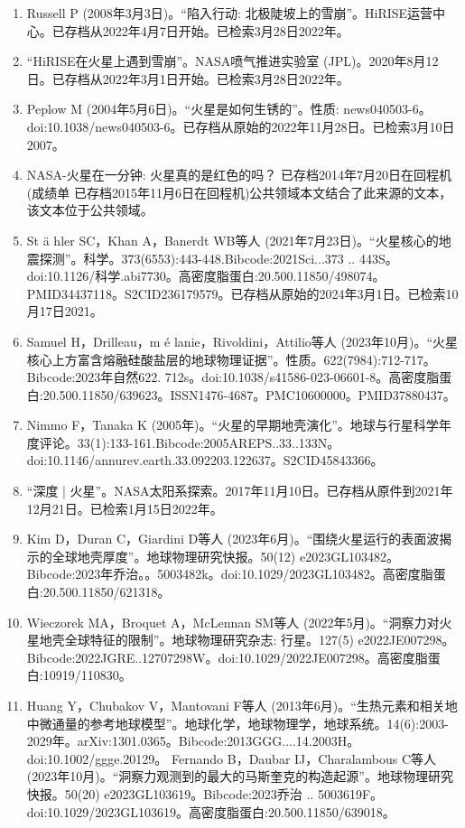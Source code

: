 \begin{enumerate}
\item Russell P (2008年3月3日)。“陷入行动: 北极陡坡上的雪崩”。HiRISE运营中心。已存档从2022年4月7日开始。已检索3月28日2022年。
\item “HiRISE在火星上遇到雪崩”。NASA喷气推进实验室 (JPL)。2020年8月12日。已存档从2022年3月1日开始。已检索3月28日2022年。
\item Peplow M (2004年5月6日)。“火星是如何生锈的”。性质: news040503-6。doi:10.1038/news040503-6。已存档从原始的2022年11月28日。已检索3月10日2007。
\item NASA-火星在一分钟: 火星真的是红色的吗？ 已存档2014年7月20日在回程机(成绩单 已存档2015年11月6日在回程机)公共领域本文结合了此来源的文本，该文本位于公共领域。
\item St ä hler SC，Khan A，Banerdt WB等人 (2021年7月23日)。“火星核心的地震探测”。科学。373(6553):443-448.Bibcode:2021Sci...373 .. 443S。doi:10.1126/科学.abi7730。高密度脂蛋白:20.500.11850/498074。PMID34437118。S2CID236179579。已存档从原始的2024年3月1日。已检索10月17日2021。   
\item Samuel H，Drilleau，m é lanie，Rivoldini，Attilio等人 (2023年10月)。“火星核心上方富含熔融硅酸盐层的地球物理证据”。性质。622(7984):712-717。Bibcode:2023年自然622. 712s。doi:10.1038/s41586-023-06601-8。高密度脂蛋白:20.500.11850/639623。ISSN1476-4687。PMC10600000。PMID37880437。    
\item Nimmo F，Tanaka K (2005年)。“火星的早期地壳演化”。地球与行星科学年度评论。33(1):133-161.Bibcode:2005AREPS..33..133N。doi:10.1146/annurev.earth.33.092203.122637。S2CID45843366。 
\item “深度 | 火星”。NASA太阳系探索。2017年11月10日。已存档从原件到2021年12月21日。已检索1月15日2022年。
\item Kim D，Duran C，Giardini D等人 (2023年6月)。“围绕火星运行的表面波揭示的全球地壳厚度”。地球物理研究快报。50(12) e2023GL103482。Bibcode:2023年乔治。。5003482k。doi:10.1029/2023GL103482。高密度脂蛋白:20.500.11850/621318。
\item Wieczorek MA，Broquet A，McLennan SM等人 (2022年5月)。“洞察力对火星地壳全球特征的限制”。地球物理研究杂志: 行星。127(5) e2022JE007298。Bibcode:2022JGRE..12707298W。doi:10.1029/2022JE007298。高密度脂蛋白:10919/110830。
\item Huang Y，Chubakov V，Mantovani F等人 (2013年6月)。“生热元素和相关地中微通量的参考地球模型”。地球化学，地球物理学，地球系统。14(6):2003-2029年。arXiv:1301.0365。Bibcode:2013GGG....14.2003H。doi:10.1002/ggge.20129。
 Fernando B，Daubar IJ，Charalambous C等人 (2023年10月)。“洞察力观测到的最大的马斯奎克的构造起源”。地球物理研究快报。50(20) e2023GL103619。Bibcode:2023乔治 .. 5003619F。doi:10.1029/2023GL103619。高密度脂蛋白:20.500.11850/639018。

\end{enumerate}
